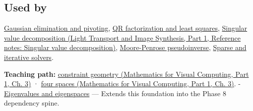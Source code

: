 \subsection{Used by}\label{appendix-8572a4a060c1-used-by}

\hypertarget{appendix-8572a4a060c1-used-by}{}

\hyperref[appendix-f6e77f4a200f]{Gaussian elimination and pivoting}, \hyperref[appendix-c3421e6b4f2c]{QR factorization and least squares}, \href{../04-Light-Transport-and-Image-Synthesis-P01/main.pdf\#nameddest=appendix-1fad5e7f36fa}{Singular value decomposition (Light Transport and Image Synthesis, Part 1, Reference notes: Singular value decomposition)}, \hyperref[appendix-541306fdbc1b]{Moore-Penrose pseudoinverse}, \hyperref[appendix-67c87a3d9e94]{Sparse and iterative solvers}.

\textbf{Teaching path:} \href{../02-Mathematics-for-Visual-Computing-P01/main.pdf\#nameddest=01-foundations-i-ch019-a-linear-equation-is-a-measurement-and-several-equations-are-geometry}{constraint geometry (Mathematics for Visual Computing, Part 1, Ch. 3)} · \href{../02-Mathematics-for-Visual-Computing-P01/main.pdf\#nameddest=01-foundations-i-ch019-rank-separates-what-the-measurements-determine-from-what-they-leave-free}{four spaces (Mathematics for Visual Computing, Part 1, Ch. 3)}. - \hyperref[appendix-0b3be18411f9]{Eigenvalues and eigenspaces} --- Extends this foundation into the Phase 8 dependency spine.
